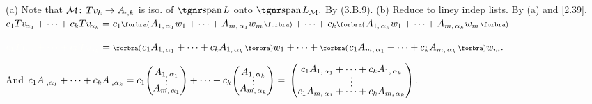 (a) Note that $\mathcal{M}\!:\,Tv_k\rightarrow A_{\cdot,k}$ is iso. of $\spn L$ onto $\spn L_{\mM}.$ By (3.B.9).\parSol{}
(b) Reduce to liney indep lists. By (a) and [2.39].\PfEnd\vspace{4pt}\quad
\Or\;$c_1Tv_{\:\!\!\alpha_1}+\dots+c_kTv_{\:\!\!\alpha_k}=c_1\BigPar{A_{1,\,{\alpha_1}}w_1+\dots+A_{m,\,{\alpha_1}}w_m}+\dots+c_k\BigPar{A_{1,\,{\alpha_k}}w_1+\dots+A_{m,\,{\alpha_k}}w_m}$\par\vspace{2pt}\quad
\Blind{\Or\;}$\Blind{c_1Tv_{\:\!\!\alpha_1}+\dots+c_kTv_{\:\!\!\alpha_k}}=\BigPar{c_1A_{1,\,{\alpha_1}}+\dots+c_kA_{1,\,{\alpha_k}}}w_1+\dots+\BigPar{c_1A_{m,\,{\alpha_1}}+\dots+c_kA_{m,\,{\alpha_k}}}w_m.$\par\vspace{4pt}\quad
\Blind{\Or\;}And \;$c_1A_{\cdot,{\alpha_1}}+\dots+c_kA_{\cdot,{\alpha_k}}=c_1{\normalsize\begin{pmatrix}A_{1,\,{\alpha_1}}\\[-4pt]\vdots\\[-10pt]A_{m,\,{\alpha_1}}\end{pmatrix}}+\dots+c_k{\normalsize\begin{pmatrix}A_{1,\,{\alpha_k}}\\[-4pt]\vdots\\[-10pt]A_{m,\,{\alpha_k}}\end{pmatrix}}{}={}\normalsize\begin{pmatrix}c_1 A_{1,\,{\alpha_1}}+\dots+c_kA_{1,\,{\alpha_k}}\\[-4pt]\vdots\\[-4pt]c_1A_{m,\,{\alpha_1}}+\dots+c_kA_{m,\,{\alpha_k}}\end{pmatrix}$.
\pagebreak\par\vspace{6pt}\quad
